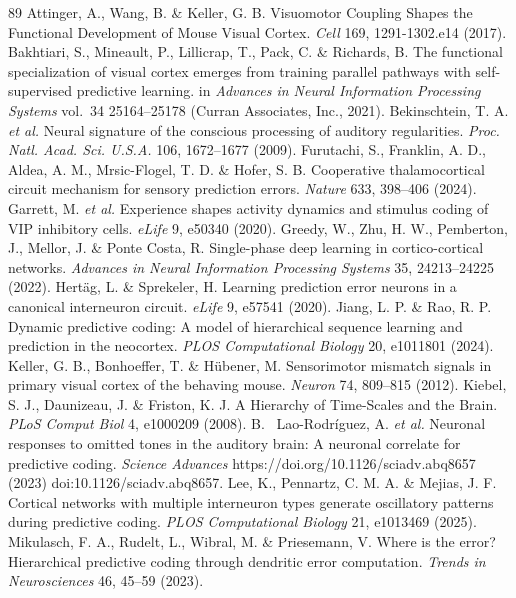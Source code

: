 \documentclass[12pt]{article}
\begin{document}
\begin{thebibliography}{89}
 Attinger, A., Wang, B. \& Keller, G. B. Visuomotor Coupling Shapes the Functional Development of Mouse Visual Cortex. \emph{Cell} 169, 1291-1302.e14 (2017).
 Bakhtiari, S., Mineault, P., Lillicrap, T., Pack, C. \& Richards, B. The functional specialization of visual cortex emerges from training parallel pathways with self-supervised predictive learning. in \emph{Advances in Neural Information Processing Systems} vol.~34 25164--25178 (Curran Associates, Inc., 2021).
 Bekinschtein, T. A. \emph{et al.} Neural signature of the conscious processing of auditory regularities. \emph{Proc. Natl. Acad. Sci. U.S.A.} 106, 1672--1677 (2009).
 Furutachi, S., Franklin, A. D., Aldea, A. M., Mrsic-Flogel, T. D. \& Hofer, S. B. Cooperative thalamocortical circuit mechanism for sensory prediction errors. \emph{Nature} 633, 398--406 (2024).
 Garrett, M. \emph{et al.} Experience shapes activity dynamics and stimulus coding of VIP inhibitory cells. \emph{eLife} 9, e50340 (2020).
 Greedy, W., Zhu, H. W., Pemberton, J., Mellor, J. \& Ponte Costa, R. Single-phase deep learning in cortico-cortical networks. \emph{Advances in Neural Information Processing Systems} 35, 24213--24225 (2022).
 Hertäg, L. \& Sprekeler, H. Learning prediction error neurons in a canonical interneuron circuit. \emph{eLife} 9, e57541 (2020).
 Jiang, L. P. \& Rao, R. P. Dynamic predictive coding: A model of hierarchical sequence learning and prediction in the neocortex. \emph{PLOS Computational Biology} 20, e1011801 (2024).
 Keller, G. B., Bonhoeffer, T. \& Hübener, M. Sensorimotor mismatch signals in primary visual cortex of the behaving mouse. \emph{Neuron} 74, 809--815 (2012).
 Kiebel, S. J., Daunizeau, J. \& Friston, K. J. A Hierarchy of Time-Scales and the Brain. \emph{PLoS Comput Biol} 4, e1000209 (2008).
 B.~ Lao-Rodríguez, A. \emph{et al.} Neuronal responses to omitted tones in the auditory brain: A neuronal correlate for predictive coding. \emph{Science Advances} https://doi.org/10.1126/sciadv.abq8657 (2023) doi:10.1126/sciadv.abq8657.
 Lee, K., Pennartz, C. M. A. \& Mejias, J. F. Cortical networks with multiple interneuron types generate oscillatory patterns during predictive coding. \emph{PLOS Computational Biology} 21, e1013469 (2025).
 Mikulasch, F. A., Rudelt, L., Wibral, M. \& Priesemann, V. Where is the error? Hierarchical predictive coding through dendritic error computation. \emph{Trends in Neurosciences} 46, 45--59 (2023).

\end{thebibliography}
\end{document}
